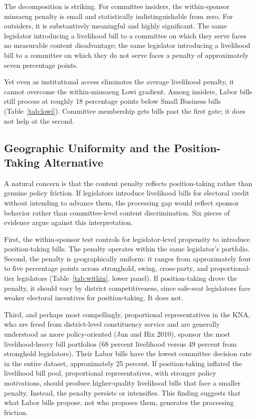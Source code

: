 \documentclass[11pt]{article}
\begin{document}
The decomposition is striking. For committee insiders, the within-sponsor minsaeng penalty is small and statistically indistinguishable from zero. For outsiders, it is substantively meaningful and highly significant. The same legislator introducing a livelihood bill to a committee on which they serve faces no measurable content disadvantage; the same legislator introducing a livelihood bill to a committee on which they do not serve faces a penalty of approximately seven percentage points.

Yet even as institutional access eliminates the average livelihood penalty, it cannot overcome the within-minsaeng Lowi gradient. Among insiders, Labor bills still process at roughly 18 percentage points below Small Business bills (Table~\ref{tab:lowi}). Committee membership gets bills past the first gate; it does not help at the second.

\subsection{Geographic Uniformity and the Position-Taking Alternative}

A natural concern is that the content penalty reflects position-taking rather than genuine policy friction. If legislators introduce livelihood bills for electoral credit without intending to advance them, the processing gap would reflect sponsor behavior rather than committee-level content discrimination. Six pieces of evidence argue against this interpretation.

First, the within-sponsor test controls for legislator-level propensity to introduce position-taking bills. The penalty operates within the same legislator's portfolio. Second, the penalty is geographically uniform: it ranges from approximately four to five percentage points across stronghold, swing, cross-party, and proportional-tier legislators (Table~\ref{tab:within}, lower panel). If position-taking drove the penalty, it should vary by district competitiveness, since safe-seat legislators face weaker electoral incentives for position-taking. It does not.

Third, and perhaps most compellingly, proportional representatives in the KNA, who are freed from district-level constituency service and are generally understood as more policy-oriented (Jun and Hix 2010), sponsor the most livelihood-heavy bill portfolios (68 percent livelihood versus 49 percent from stronghold legislators). Their Labor bills have the lowest committee decision rate in the entire dataset, approximately 25 percent. If position-taking inflated the livelihood bill pool, proportional representatives, with stronger policy motivations, should produce higher-quality livelihood bills that face a smaller penalty. Instead, the penalty persists or intensifies. This finding suggests that what Labor bills propose, not who proposes them, generates the processing friction.
\end{document}
